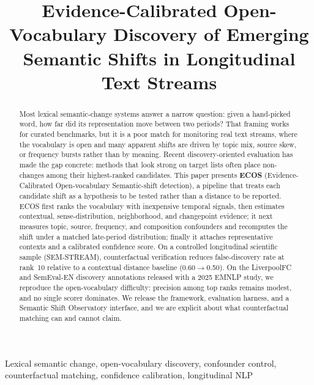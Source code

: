 \documentclass[journal]{IEEEtran}
\begin{document}
\title{Evidence-Calibrated Open-Vocabulary Discovery of Emerging Semantic Shifts in Longitudinal Text Streams}

\author{
}

\maketitle

\begin{abstract}
Most lexical semantic-change systems answer a narrow question: given a hand-picked word, how far did its representation move between two periods?
That framing works for curated benchmarks, but it is a poor match for monitoring real text streams, where the vocabulary is open and many apparent shifts are driven by topic mix, source skew, or frequency bursts rather than by meaning.
Recent discovery-oriented evaluation has made the gap concrete: methods that look strong on target lists often place non-changes among their highest-ranked candidates.
This paper presents \textbf{ECOS} (Evidence-Calibrated Open-vocabulary Semantic-shift detection), a pipeline that treats each candidate shift as a hypothesis to be tested rather than a distance to be reported.
ECOS first ranks the vocabulary with inexpensive temporal signals, then estimates contextual, sense-distribution, neighborhood, and changepoint evidence; it next measures topic, source, frequency, and composition confounders and recomputes the shift under a matched late-period distribution; finally it attaches representative contexts and a calibrated confidence score.
On a controlled longitudinal scientific sample (SEM-STREAM), counterfactual verification reduces false-discovery rate at rank~10 relative to a contextual distance baseline (0.60$\rightarrow$0.50).
On the LiverpoolFC and SemEval-EN discovery annotations released with a 2025 EMNLP study, we reproduce the open-vocabulary difficulty: precision among top ranks remains modest, and no single scorer dominates.
We release the framework, evaluation harness, and a Semantic Shift Observatory interface, and we are explicit about what counterfactual matching can and cannot claim.
\end{abstract}

\begin{IEEEkeywords}
Lexical semantic change, open-vocabulary discovery, confounder control, counterfactual matching, confidence calibration, longitudinal NLP
\end{IEEEkeywords}
\end{document}
